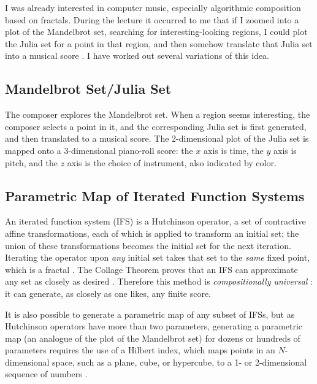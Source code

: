 \documentclass[]{interact}
\theoremstyle{plain}%
\theoremstyle{definition}
\theoremstyle{remark}
\begin{document}
I was already interested in computer music, especially algorithmic composition based on fractals. During the lecture it occurred to me that if I zoomed into a plot of the Mandelbrot set, searching for interesting-looking regions, I could plot the Julia set for a point in that region, and then somehow translate that Julia set into a musical score \citep{Anonymous1992}. I have worked out several variations of this idea.

\subsection{Mandelbrot Set/Julia Set}

The composer explores the Mandelbrot set. When a region seems interesting, the composer selects a point in it, and the corresponding Julia set is first generated, and then translated to a musical score. The 2-dimensional plot of the Julia set is mapped onto a 3-dimensional piano-roll score: the $x$ axis is time, the $y$ axis is pitch, and the $z$ axis is the choice of instrument, also indicated by color.

\subsection{Parametric Map of Iterated Function Systems}

An iterated function system (IFS) is a Hutchinson operator, a set of contractive affine transformations, each of which is applied to transform an initial set; the union of these transformations becomes the initial set for the next iteration. Iterating the operator upon \emph{any} initial set takes that set to the \emph{same} fixed point, which is a fractal \citep{barnsley1985iterated, barnsley1993}. The Collage Theorem proves that an IFS can approximate any set as closely as desired \citep{barnsley1989fractal, barnsley1993}. Therefore this method is \emph{compositionally universal} \citep{Anonymous1992, Anonymous2023scoregraphs}: it can generate, as closely as one likes, any finite score. 

It is also possible to generate a parametric map of any subset of IFSs, but as Hutchinson operators have more than two parameters, generating a parametric map (an analogue of the plot of the Mandelbrot set) for dozens or hundreds of parameters requires the use of a Hilbert index, which maps points in an $N$-dimensional space, such as a plane, cube, or hypercube, to a 1- or 2-dimensional sequence of numbers \citep{patrick1968mapping}. 
\end{document}
